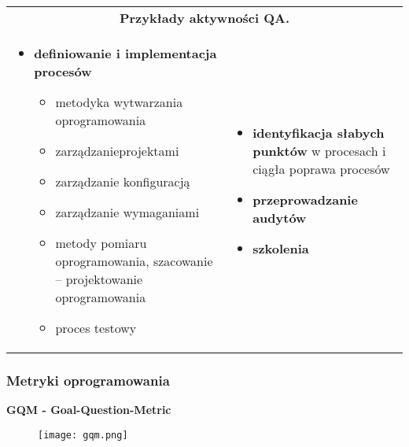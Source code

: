 \documentclass[../main.tex]{subfiles}
\begin{document}
    \begin{table}[H]
        \begin{center}
            \begin{tabular}{p{8cm} p{8cm}}
                \multicolumn{2}{c}{\textbf{Przykłady aktywności QA.}}\\
                \begin{itemize}
                    \item \textbf{definiowanie i implementacja procesów}
                    \begin{itemize}
                        \item metodyka wytwarzania oprogramowania
                        \item zarządzanieprojektami
                        \item zarządzanie konfiguracją
                        \item zarządzanie wymaganiami
                        \item metody pomiaru oprogramowania, szacowanie – projektowanie oprogramowania
                        \item proces testowy
                    \end{itemize}
                \end{itemize}
                &
                \begin{itemize}
                    \item \textbf{identyfikacja słabych punktów} w procesach i ciągła poprawa procesów
                    \item \textbf{przeprowadzanie audytów}
                    \item \textbf{szkolenia}
                \end{itemize}
            \end{tabular}
        \end{center}
    \end{table}

    \subsubsection{Metryki oprogramowania}

    \textbf{GQM - Goal-Question-Metric}

    \begin{figure}[H]
        \texttt{[image: gqm.png]}
    \end{figure}
\end{document}
